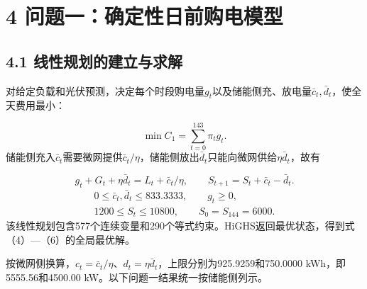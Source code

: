 \documentclass[UTF8,a4paper,zihao=-4,fontset=windows]{ctexart}
\begin{document}
\section{4 问题一：确定性日前购电模型}
\subsection{4.1 线性规划的建立与求解}
对给定负载和光伏预测，决定每个时段购电量$g_t$以及储能侧充、放电量$\bar c_t,\bar d_t$，使全天费用最小：
\par
\begin{equation}
\min C_1=\sum_{t=0}^{143}\pi_tg_t. \tag{4}
\end{equation}
储能侧充入$\bar c_t$需要微网提供$\bar c_t/\eta$，储能侧放出$\bar d_t$只能向微网供给$\eta\bar d_t$，故有
\par
\begin{equation}
g_t+G_t+\eta\bar d_t=L_t+\bar c_t/\eta,\qquad S_{t+1}=S_t+\bar c_t-\bar d_t. \tag{5}
\end{equation}
\begin{equation}
\begin{gathered}
0\le\bar c_t,\bar d_t\le833.3333,\qquad g_t\ge0,\\
1200\le S_t\le10800,\qquad S_0=S_{144}=6000.
\end{gathered} \tag{6}
\end{equation}
该线性规划包含577个连续变量和290个等式约束。HiGHS返回最优状态，得到式（4）—（6）的全局最优解。
\par
按微网侧换算，$c_t=\bar c_t/\eta$、$d_t=\eta\bar d_t$，上限分别为925.9259和750.0000 kWh，即5555.56和4500.00 kW。以下问题一结果统一按储能侧列示。
\par
\end{document}
